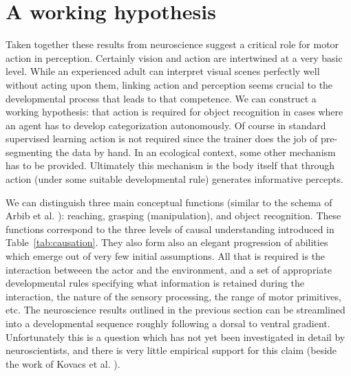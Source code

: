\fi



%
%
%







\section{A working hypothesis}


Taken together these results from neuroscience suggest a critical role
for motor action in perception. Certainly vision and action are
intertwined at a very basic level.  While an
experienced adult can interpret visual scenes perfectly well without
acting upon them, linking action and perception seems crucial to the
developmental process that leads to that competence.  We can construct
a working hypothesis: that action is required for object recognition in
cases where an agent has to develop categorization autonomously. 
Of course in standard supervised learning action is not required since
the trainer does the job of pre-segmenting the data by hand.  In an
ecological context, some other mechanism has to be provided.
Ultimately this mechanism is the body itself that through action
(under some suitable developmental rule) generates informative
percepts.

We can distinguish three main conceptual functions (similar to the 
schema of Arbib et al. \cite{arbib-1981}): reaching, grasping (manipulation), and
object recognition. These functions correspond to the three levels of causal understanding introduced in Table~\ref{tab:causation}.
They also form also an elegant progression of abilities which emerge out
of very few initial assumptions. All that is required is the 
interaction betweeen the actor and the environment, and a set of appropriate
developmental rules specifying what information is retained during the
interaction, the nature of the sensory processing, the range of motor
primitives, etc. 
%
The neuroscience results outlined in the previous section can be streamlined
into a developmental sequence roughly following a dorsal to ventral
gradient. Unfortunately this is a question which has not yet been investigated in detail
by neuroscientists, and there is very little empirical support for this claim
(beside the work of Kovacs et al. \cite{kovacs00human}).

